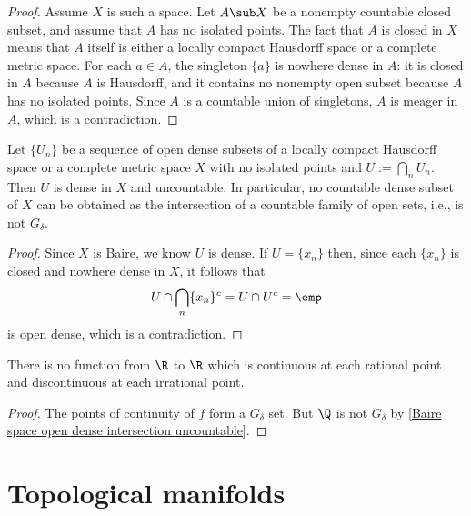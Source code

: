 \begin{proof}
Assume $X$ is such a space. Let $A\sub X$ be a nonempty countable closed subset, and assume that $A$ has no isolated points. The fact that $A$ is closed in $X$ means that $A$ itself is either a locally compact Hausdorff space or a complete metric space. For each $a\in A$, the singleton $\{a\}$ is nowhere dense in $A$: it is closed in $A$ because $A$ is Hausdorff, and it contains no nonempty open subset because $A$ has no isolated points. Since $A$ is a countable union of singletons, $A$ is meager in $A$, which is a contradiction.
\end{proof}
\begin{proposition}\label{Baire space open dense intersection uncountable}
Let $\{U_n\}$ be a sequence of open dense subsets of a locally compact Hausdorff space or a complete metric space $X$ with no isolated points and $U:=\bigcap_nU_n$. Then $U$ is dense in $X$ and uncountable. In particular, no countable dense subset of $X$ can be obtained as the intersection of a countable family of open sets, i.e., is not $G_\delta$.
\end{proposition}
\begin{proof}
Since $X$ is Baire, we know $U$ is dense. If $U=\{x_n\}$ then, since each $\{x_n\}$ is closed and nowhere dense in $X$, it follows that
\[U\cap\bigcap_n\{x_n\}^c=U\cap U^c=\emp\]
is open dense, which is a contradiction. 
\end{proof}
\begin{corollary}
There is no function from $\R$ to $\R$ which is continuous at each rational point and discontinuous at each irrational point.
\end{corollary}
\begin{proof}
The points of continuity of $f$ form a $G_\delta$ set. But $\Q$ is not $G_\delta$ by \cref{Baire space open dense intersection uncountable}.
\end{proof}
\section{Topological manifolds}
